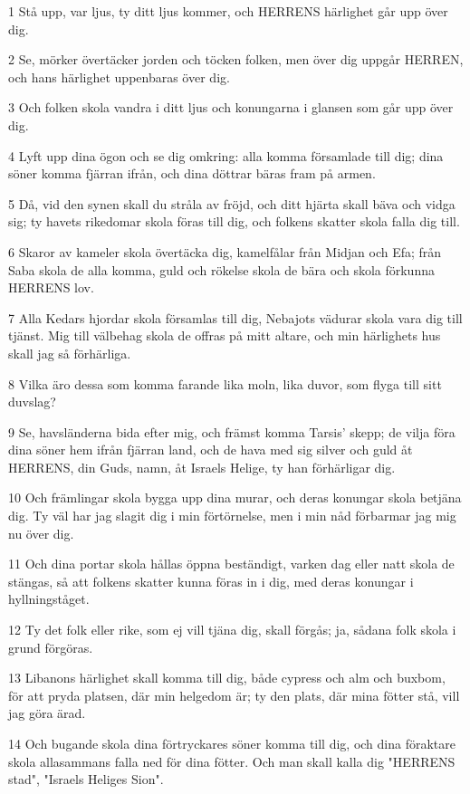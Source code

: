 \par 1 Stå upp, var ljus, ty ditt ljus kommer, och HERRENS härlighet går upp över dig.
\par 2 Se, mörker övertäcker jorden och töcken folken, men över dig uppgår HERREN, och hans härlighet uppenbaras över dig.
\par 3 Och folken skola vandra i ditt ljus och konungarna i glansen som går upp över dig.
\par 4 Lyft upp dina ögon och se dig omkring: alla komma församlade till dig; dina söner komma fjärran ifrån, och dina döttrar bäras fram på armen.
\par 5 Då, vid den synen skall du stråla av fröjd, och ditt hjärta skall bäva och vidga sig; ty havets rikedomar skola föras till dig, och folkens skatter skola falla dig till.
\par 6 Skaror av kameler skola övertäcka dig, kamelfålar från Midjan och Efa; från Saba skola de alla komma, guld och rökelse skola de bära och skola förkunna HERRENS lov.
\par 7 Alla Kedars hjordar skola församlas till dig, Nebajots vädurar skola vara dig till tjänst. Mig till välbehag skola de offras på mitt altare, och min härlighets hus skall jag så förhärliga.
\par 8 Vilka äro dessa som komma farande lika moln, lika duvor, som flyga till sitt duvslag?
\par 9 Se, havsländerna bida efter mig, och främst komma Tarsis' skepp; de vilja föra dina söner hem ifrån fjärran land, och de hava med sig silver och guld åt HERRENS, din Guds, namn, åt Israels Helige, ty han förhärligar dig.
\par 10 Och främlingar skola bygga upp dina murar, och deras konungar skola betjäna dig. Ty väl har jag slagit dig i min förtörnelse, men i min nåd förbarmar jag mig nu över dig.
\par 11 Och dina portar skola hållas öppna beständigt, varken dag eller natt skola de stängas, så att folkens skatter kunna föras in i dig, med deras konungar i hyllningståget.
\par 12 Ty det folk eller rike, som ej vill tjäna dig, skall förgås; ja, sådana folk skola i grund förgöras.
\par 13 Libanons härlighet skall komma till dig, både cypress och alm och buxbom, för att pryda platsen, där min helgedom är; ty den plats, där mina fötter stå, vill jag göra ärad.
\par 14 Och bugande skola dina förtryckares söner komma till dig, och dina föraktare skola allasammans falla ned för dina fötter. Och man skall kalla dig "HERRENS stad", "Israels Heliges Sion".
